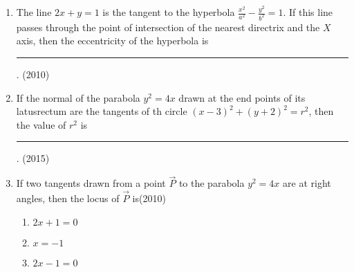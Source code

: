 \begin{enumerate}[label=\thesubsection.\arabic*.,ref=\thesubsection.\theenumi]
\item The line $2x+y=1$ is the tangent to the hyperbola $\frac{x^2}{a^2}-\frac{y^2}{b^2}=1$. If this line passes through the point of intersection of the nearest directrix and the $X$ axis, then the eccentricity of the hyperbola is
\rule{1cm}{0.1pt}.
\hfill(2010)
\iffalse
\item A Vertical line passing through point $(h,0)$ intersects the ellipse   at the points  $\Vec{P}$ and $\Vec{Q}$. Let the tangents to the ellipse at $\Vec{P}$ and $\Vec{Q}$ meet at the points $\Vec{R}$. If $\Delta(h)$= area of the triangle $PQR$, $\Delta_1$= ma
then 
\hfill(2013)
\begin{multicols}{2}
\begin{enumerate}
    \item $g(x)$ is continuous but not differentiable at a
    \item $g(x)$ is differentiable on R
    \item $g(x)$ is continuous but not differentiable at b
    \item $g(x)$ is continuous and differentiable either(a) or (b) but not both 
    \end{enumerate}
\end{multicols}
    \fi
\item If the normal of the parabola $y^2=4x$ drawn at the end points of its latusrectum are the tangents of th circle $(x-3)^2+(y+2)^2=r^2$, then the value of $r^2$ is \rule{1cm}{0.1pt}.
\hfill(2015)
\iffalse
\item Suppose that the focii of the ellipse $\frac{x^2}{9}+\frac{y^2}{5}=1$ are $(f_1,0)$ and ($f_2$,0) where $f_1>0$ and $f_1<0$.Let $P_1$ and $P_2$ be two parabolas with a common vertex at $(0,0)$ and with foci at ($f_1$,0) and (2$f_2$,0),respectively. Let $T_1$ be a tangent to $P_1$ which passes through (2$f_2$,0) and $T_2$ be a tangent to $P_2$ which passes through ($f_1$,0).If $m_1$ is the slope of $T_1$ and $m_2$ is the slope of $T_2$,then the value of
\hfill(2015)
\fi
\item If two tangents drawn from a point $\vec{P}$ to the parabola $y^2=4x$ are at right angles, then the locus of $\vec{P}$ is\hfill(2010)
\begin{multicols}{4}
\begin{enumerate}
    \item $2x+1=0$
    \item $x=-1$
    \item $2x-1=0$

\end{enumerate}
\end{multicols}
\end{enumerate}
